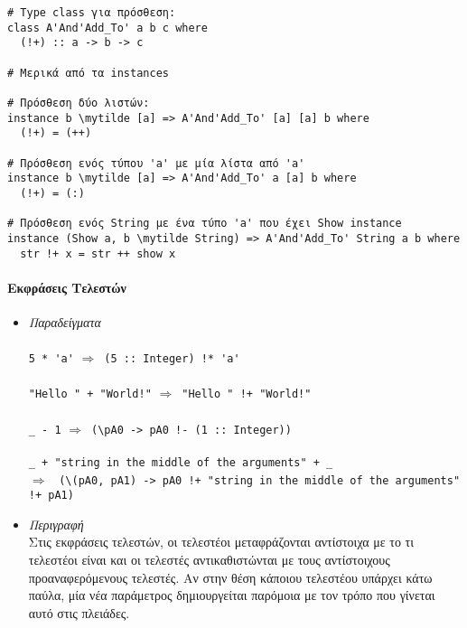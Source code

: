 \documentclass[diploma]{softlab-thesis}
\def\lra{$\Longrightarrow$\ }
\newcommand{\mytilde}{$\sim$}
\begin{document}
\begin{Verbatim}[commandchars=\\\{\}]
# Type class για πρόσθεση:
class A'And'Add_To' a b c where
  (!+) :: a -> b -> c

# Μερικά από τα instances

# Πρόσθεση δύο λιστών:
instance b \mytilde [a] => A'And'Add_To' [a] [a] b where
  (!+) = (++)

# Πρόσθεση ενός τύπου 'a' με μία λίστα από 'a'
instance b \mytilde [a] => A'And'Add_To' a [a] b where
  (!+) = (:)

# Πρόσθεση ενός String με ένα τύπο 'a' που έχει Show instance
instance (Show a, b \mytilde String) => A'And'Add_To' String a b where
  str !+ x = str ++ show x

\end{Verbatim}

\paragraph{Εκφράσεις Τελεστών}

\begin{itemize}
\item
\textit{Παραδείγματα}\\\\
\verb|5 * 'a'| \lra \verb|(5 :: Integer) !* 'a'|
\\\\
\verb|"Hello " + "World!"| \lra \verb|"Hello " !+ "World!"|
\\\\
\verb|_ - 1| \lra \verb|(\pA0 -> pA0 !- (1 :: Integer))|
\\\\
\verb|_ + "string in the middle of the arguments" + _|
\\\lra
\verb|(\(pA0, pA1) -> pA0 !+ "string in the middle of the arguments" !+ pA1)|
\\

\item
\textit{Περιγραφή}\\

Στις εκφράσεις τελεστών, οι τελεστέοι μεταφράζονται αντίστοιχα με το τι
τελεστέοι είναι και οι τελεστές αντικαθιστώνται με τους αντίστοιχους
προαναφερόμενους τελεστές. Αν στην θέση κάποιου τελεστέου υπάρχει κάτω παύλα,
μία νέα παράμετρος δημιουργείται παρόμοια με τον τρόπο που γίνεται αυτό στις
πλειάδες.

\end{itemize}
\end{document}
